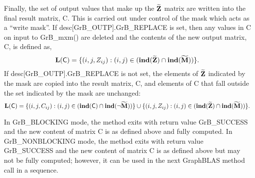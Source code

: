 Finally, the set of output values that make up the ${\bf \widetilde{Z}}$ 
matrix are written into the final result matrix, {\sf C}. 
This is carried out under control of the mask which acts as a ``write mask''.
If {\sf desc[GrB\_OUTP].GrB\_REPLACE} is set, then any values in {\sf C} on 
input to {\sf GrB\_mxm()} are deleted and the contents of the new output matrix,
{\sf C}, is defined as,
\[ 
\bold{L}({\sf C}) = \{(i,j,Z_{ij}) : (i,j) \in (\bold{ind}({\bf \widetilde{Z}}) 
\cap \bold{ind}({\bf \widetilde{M}})) \}. 
\]
If {\sf desc[GrB\_OUTP].GrB\_REPLACE} is not set, the elements of 
${\bf \widetilde{Z}}$ indicated by the mask are copied into the result 
matrix, {\sf C}, and elements of {\sf C} that fall outside the set 
indicated by the mask are unchanged:
\[ 
\bold{L}({\sf C}) = \{(i,j,C_{ij}) : (i,j) \in (\bold{ind}({\bf \sf C}) \cap \bold{ind}(\neg {\bf \widetilde{M}})) \} \cup \{(i,j,Z_{ij}) : (i,j) \in (\bold{ind}({\bf \widetilde{Z}}) \cap \bold{ind}({\bf \widetilde{M}})) \}. 
\]

In {\sf GrB\_BLOCKING} mode, the method exits with return value {\sf GrB\_SUCCESS} and the new content of matrix {\sf C} is as defined above and fully computed.
In {\sf GrB\_NONBLOCKING} mode, the method exits with return value {\sf GrB\_SUCCESS} and the new content of matrix {\sf C} is as defined above but may not be fully computed; however, it can be used in the next GraphBLAS 
method call in a sequence.
